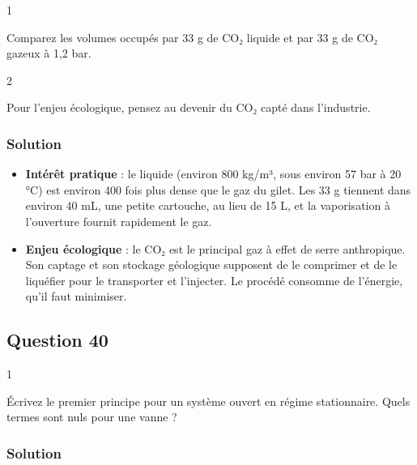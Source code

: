 \documentclass[11pt,a4paper]{article}
\providecommand{\tightlist}{\setlength{\itemsep}{0pt}\setlength{\parskip}{0pt}}
\begin{document}
\begin{indication}{1}

Comparez les volumes occupés par 33 g de CO₂ liquide et par 33 g de CO₂ gazeux à 1,2 bar.

\end{indication}

\begin{indication}{2}

Pour l'enjeu écologique, pensez au devenir du CO₂ capté dans l'industrie.

\end{indication}

\hypertarget{solution-38}{%
\subsubsection{Solution}\label{solution-38}}

\begin{itemize}
\tightlist
\item
  \textbf{Intérêt pratique} : le liquide (environ 800 kg/m³, sous environ 57 bar à 20 °C) est environ 400 fois plus dense que le gaz du gilet. Les 33 g tiennent dans environ 40 mL, une petite cartouche, au lieu de 15 L, et la vaporisation à l'ouverture fournit rapidement le gaz.
\item
  \textbf{Enjeu écologique} : le CO₂ est le principal gaz à effet de serre anthropique. Son captage et son stockage géologique supposent de le comprimer et de le liquéfier pour le transporter et l'injecter. Le procédé consomme de l'énergie, qu'il faut minimiser.
\end{itemize}

\hypertarget{question-40}{%
\subsection{Question 40}\label{question-40}}

\begin{indication}{1}

Écrivez le premier principe pour un système ouvert en régime stationnaire. Quels termes sont nuls pour une vanne ?

\end{indication}

\hypertarget{solution-39}{%
\subsubsection{Solution}\label{solution-39}}
\end{document}
